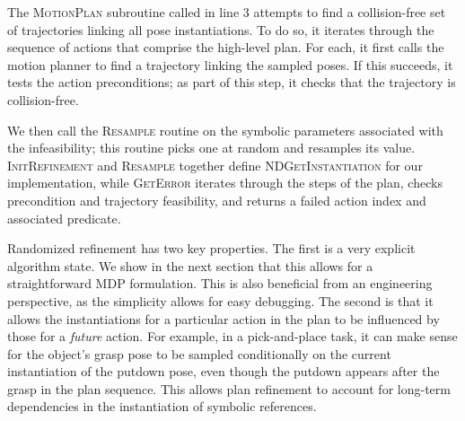 The \textsc{MotionPlan} subroutine called in line 3 attempts to
find a collision-free set of trajectories linking all pose instantiations.
To do so, it iterates through the sequence of actions that comprise the high-level plan.
For each, it first calls the motion planner to find a trajectory
linking the sampled poses. If this succeeds, it tests the action preconditions;
as part of this step, it checks that the trajectory is collision-free.

We then call the \textsc{Resample} routine on the symbolic parameters
associated with the infeasibility; this routine picks one at random and
resamples its value. \textsc{InitRefinement} and \textsc{Resample} together define
\textsc{NDGetInstantiation} for our implementation, while \textsc{GetError} iterates
through the steps of the plan, checks precondition and trajectory feasibility, and returns
a failed action index and associated predicate. 

Randomized refinement has two key properties. The first is a very explicit algorithm state.
We show in the next section that this allows for a straightforward MDP
formulation. This is also beneficial from an
engineering perspective, as the simplicity allows for easy debugging. The second is that
it allows the instantiations for a particular action in
the plan to be influenced by those for a \emph{future} action. For example, in a
pick-and-place task, it can make sense for the object's grasp pose to be sampled
conditionally on the current instantiation of the putdown pose, even though the putdown
appears after the grasp in the plan sequence. This allows plan refinement to account for
long-term dependencies in the instantiation of symbolic references.